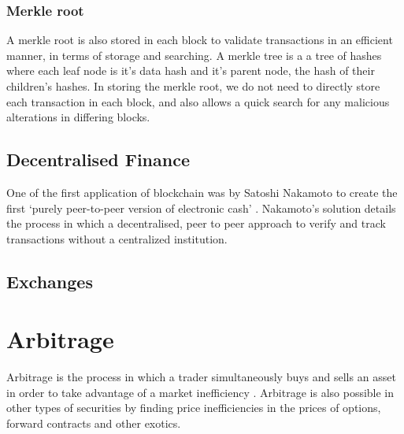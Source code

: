 \subsubsection{Merkle root}
A merkle root is also stored in each block to validate transactions in an efficient manner, in terms of storage and searching. A merkle tree is a a tree of hashes where each leaf node is it's data hash and it's parent node, the hash of their children's hashes. In storing the merkle root, we do not need to directly store each transaction in each block, and also allows a quick search for any malicious alterations in differing blocks\cite{noauthor_merkle_nodate}.

\subsection{Decentralised Finance}
One of the first application of blockchain was by Satoshi Nakamoto to create the first `purely peer-to-peer version of electronic cash' \cite{nakamoto2009bitcoin}. Nakamoto's solution details the process in which a decentralised, peer to peer approach to verify and track transactions without a centralized institution.

\subsection{Exchanges}

\section{Arbitrage}
Arbitrage is the process in which a trader simultaneously buys and sells an asset in order to take advantage of a market inefficiency \cite{businessinsightsblog_2021}. Arbitrage is also possible in other types of securities by finding price inefficiencies in the prices of options, forward contracts and other exotics.


